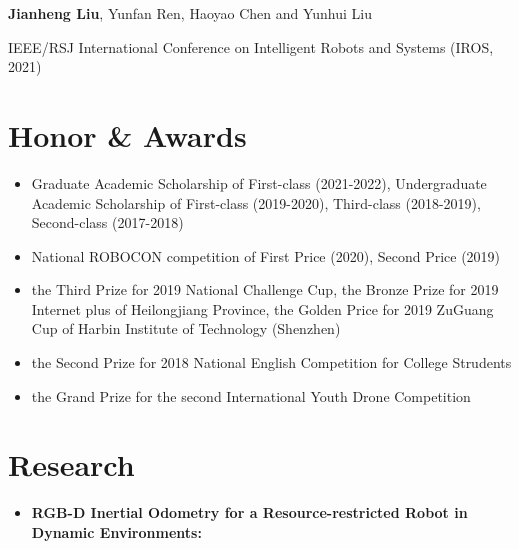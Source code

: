 \documentclass[11pt,a4paper,sans]{moderncv}        %
\begin{document}
{\begin{itemize}
{\small{\textbf{Jianheng Liu}, Yunfan Ren, Haoyao Chen and Yunhui Liu}

\small{IEEE/RSJ International Conference on Intelligent Robots and Systems (IROS, 2021) }
}


\end{itemize}

\section{Honor \& Awards}

\vspace{6pt}

\begin{itemize}

\item{Graduate Academic Scholarship of First-class (2021-2022), Undergraduate Academic Scholarship of First-class (2019-2020), Third-class (2018-2019), Second-class (2017-2018)}

\item{National ROBOCON competition of First Price (2020), Second Price (2019)}

\item{the Third Prize for 2019 National Challenge Cup, the Bronze Prize for 2019 Internet plus of Heilongjiang Province, the Golden Price for 2019  ZuGuang Cup of Harbin Institute of Technology (Shenzhen)}

\item{the Second Prize for 2018 National English Competition for College Strudents}

\item{the Grand Prize for the second International Youth Drone Competition}

\end{itemize}


\section{Research}

\vspace{6pt}

\begin{itemize}

\item \textbf{RGB-D Inertial Odometry for a Resource-restricted Robot in Dynamic Environments:} 


\end{itemize}}
\end{document}
